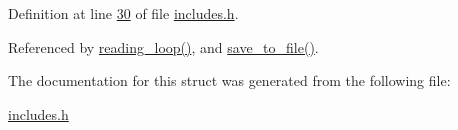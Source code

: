 Definition at line \hyperlink{a00037_source_l00030}{30} of file \hyperlink{a00037_source}{includes.\-h}.



Referenced by \hyperlink{a00035_source_l00302}{reading\-\_\-loop()}, and \hyperlink{a00035_source_l00421}{save\-\_\-to\-\_\-file()}.



The documentation for this struct was generated from the following file\-:\begin{DoxyCompactItemize}
\item 
\hyperlink{a00037}{includes.\-h}\end{DoxyCompactItemize}
